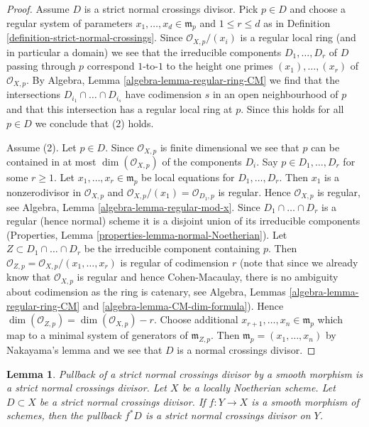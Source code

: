 \documentclass{stacks-project}
\newenvironment{slogan}{\comment}{\endcomment}
\theoremstyle{plain}
\newtheorem{lemma}[subsection]{Lemma}
\theoremstyle{definition}
\theoremstyle{remark}
\numberwithin{equation}{subsection}
\begin{document}
\begin{proof}
Assume $D$ is a strict normal crossings divisor. Pick $p \in D$
and choose a regular system of parameters $x_1, \ldots, x_d \in \mathfrak m_p$
and $1 \leq r \leq d$ as in
Definition \ref{definition-strict-normal-crossings}.
Since $\mathcal{O}_{X, p}/(x_i)$ is a regular local ring
(and in particular a domain) we see that the irreducible components
$D_1, \ldots, D_r$ of $D$ passing through $p$ correspond $1$-to-$1$
to the height one primes $(x_1), \ldots, (x_r)$ of $\mathcal{O}_{X, p}$.
By Algebra, Lemma \ref{algebra-lemma-regular-ring-CM}
we find that the intersections $D_{i_1} \cap \ldots \cap D_{i_s}$
have codimension $s$ in an open neighbourhood of $p$
and that this intersection has a regular local ring at $p$.
Since this holds for all $p \in D$ we conclude that (2) holds.

\medskip\noindent
Assume (2). Let $p \in D$. Since $\mathcal{O}_{X, p}$ is finite
dimensional we see that $p$ can be contained in at most
$\dim(\mathcal{O}_{X, p})$ of the components $D_i$.
Say $p \in D_1, \ldots, D_r$ for some $r \geq 1$.
Let $x_1, \ldots, x_r \in \mathfrak m_p$ be local equations
for $D_1, \ldots, D_r$. Then $x_1$ is a nonzerodivisor in $\mathcal{O}_{X, p}$
and $\mathcal{O}_{X, p}/(x_1) = \mathcal{O}_{D_1, p}$ is regular.
Hence $\mathcal{O}_{X, p}$ is regular, see
Algebra, Lemma \ref{algebra-lemma-regular-mod-x}.
Since $D_1 \cap \ldots \cap D_r$ is a regular (hence normal) scheme
it is a disjoint union of its irreducible components
(Properties, Lemma \ref{properties-lemma-normal-Noetherian}).
Let $Z \subset D_1 \cap \ldots \cap D_r$
be the irreducible component containing $p$.
Then $\mathcal{O}_{Z, p} = \mathcal{O}_{X, p}/(x_1, \ldots, x_r)$
is regular of codimension $r$ (note that since we already know
that $\mathcal{O}_{X, p}$ is regular and hence Cohen-Macaulay,
there is no ambiguity about codimension as the ring is catenary, see
Algebra, Lemmas \ref{algebra-lemma-regular-ring-CM} and
\ref{algebra-lemma-CM-dim-formula}).
Hence $\dim(\mathcal{O}_{Z, p}) = \dim(\mathcal{O}_{X, p}) - r$.
Choose additional $x_{r + 1}, \ldots, x_n \in \mathfrak m_p$
which map to a minimal system of generators of $\mathfrak m_{Z, p}$.
Then $\mathfrak m_p = (x_1, \ldots, x_n)$ by Nakayama's lemma
and we see that $D$ is a normal crossings divisor.
\end{proof}

\begin{lemma}
\label{lemma-smooth-pullback-strict-normal-crossings}
\begin{slogan}
Pullback of a strict normal crossings divisor by a smooth
morphism is a strict normal crossings divisor.
\end{slogan}
Let $X$ be a locally Noetherian scheme. Let $D \subset X$ be a
strict normal crossings divisor. If $f : Y \to X$ is a smooth
morphism of schemes, then the pullback $f^*D$ is a
strict normal crossings divisor on $Y$.
\end{lemma}
\end{document}
